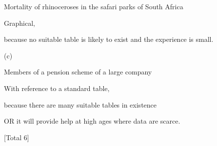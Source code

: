\documentclass[a4paper,12pt]{article}
\begin{document}

Mortality of rhinoceroses in the safari parks of South Africa

Graphical, 

because no suitable table is likely to exist and the experience is small. 


(c)

Members of a pension scheme of a large company

With reference to a standard table,



because there are many suitable tables in existence

OR it will provide help at high ages where data are scarce.



[Total 6]


\end{document}
